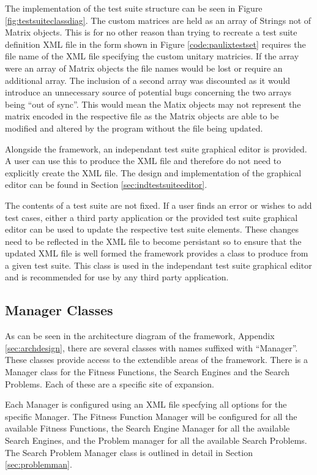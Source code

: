 The implementation of the test suite structure can be seen in Figure \ref{fig:testsuiteclassdiag}.
The custom matrices are held as an array of Strings not of Matrix objects.
This is for no other reason than trying to recreate a test suite definition XML file in the form shown in Figure \ref{code:paulixtestset} requires the file name of the XML file specifying the custom unitary matricies.
If the array were an array of Matrix objects the file names would be lost or require an additional array.
The inclusion of a second array was discounted as it would introduce an unnecessary source of potential bugs concerning the two arrays being ``out of sync''.
This would mean the Matix objects may not represent the matrix encoded in the respective file as the Matrix objects are able to be modified and altered by the program without the file being updated.

Alongside the framework, an independant test suite graphical editor is provided.
A user can use this to produce the XML file and therefore do not need to explicitly create the XML file.
The design and implementation of the graphical editor can be found in Section \ref{sec:indtestsuiteeditor}.

The contents of a test suite are not fixed.
If a user finds an error or wishes to add test cases, either a third party application or the provided test suite graphical editor can be used to update the respective test suite elements.
These changes need to be reflected in the XML file to become persistant so to ensure that the updated XML file is well formed the framework provides a class to produce from a given test suite.
This class is used in the independant test suite graphical editor and is recommended for use by any third party application.

\subsection{Manager Classes}
\label{sec:manclasses}
As can be seen in the architecture diagram of the framework, Appendix \ref{sec:archdesign}, there are several classes with names suffixed with ``Manager''.
These classes provide access to the extendible areas of the framework.
There is a Manager class for the Fitness Functions, the Search Engines and the Search Problems.
Each of these are a specific site of expansion.

Each Manager is configured using an XML file specfying all options for the specific Manager.
The Fitness Function Manager will be configured for all the available Fitness Functions, the Search Engine Manager for all the available Search Engines, and the Problem manager for all the available Search Problems.
The Search Problem Manager class is outlined in detail in Section \ref{sec:problemman}.

